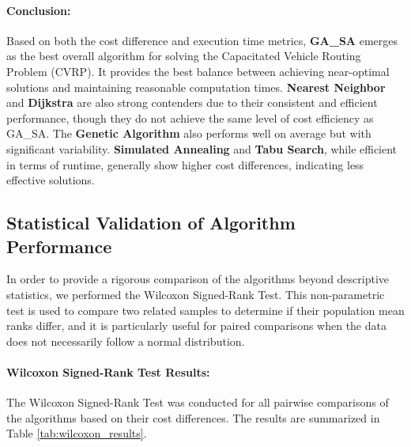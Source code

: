 \documentclass{article}
\begin{document}
    \paragraph{Conclusion:}
    Based on both the cost difference and execution time metrics, \textbf{GA\_SA} emerges as the best overall algorithm for solving the Capacitated Vehicle Routing Problem (CVRP). It provides the best balance between achieving near-optimal solutions and maintaining reasonable computation times. \textbf{Nearest Neighbor} and \textbf{Dijkstra} are also strong contenders due to their consistent and efficient performance, though they do not achieve the same level of cost efficiency as GA\_SA. The \textbf{Genetic Algorithm} also performs well on average but with significant variability. \textbf{Simulated Annealing} and \textbf{Tabu Search}, while efficient in terms of runtime, generally show higher cost differences, indicating less effective solutions.

    \subsection{Statistical Validation of Algorithm Performance}

    In order to provide a rigorous comparison of the algorithms beyond descriptive statistics, we performed the Wilcoxon Signed-Rank Test. This non-parametric test is used to compare two related samples to determine if their population mean ranks differ, and it is particularly useful for paired comparisons when the data does not necessarily follow a normal distribution.

    \paragraph{Wilcoxon Signed-Rank Test Results:}
    The Wilcoxon Signed-Rank Test was conducted for all pairwise comparisons of the algorithms based on their cost differences. The results are summarized in Table \ref{tab:wilcoxon_results}.
\end{document}
